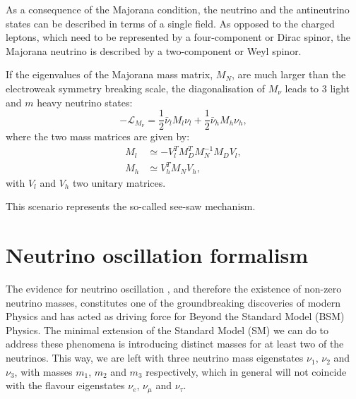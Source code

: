 As a consequence of the Majorana condition, the neutrino and the antineutrino states can be described in terms of a single field. As opposed to the charged leptons, which need to be represented by a four-component or Dirac spinor, the Majorana neutrino is described by a two-component or Weyl spinor.

If the eigenvalues of the Majorana mass matrix, $M_{N}$, are much larger than the electroweak symmetry breaking scale, the diagonalisation of $M_{\nu}$ leads to $3$ light and $m$ heavy neutrino states:
\begin{equation}
	-\mathcal{L}_{M_{\nu}} = \frac{1}{2} \bar{\nu}_{l} M_{l} \nu_{l} + \frac{1}{2} \bar{\nu}_{h} M_{h} \nu_{h},
\end{equation}
where the two mass matrices are given by:
\begin{equation}
	\begin{split}
		M_{l} &\simeq -V_{l}^{T} M_{D}^{T} M_{N}^{-1} M_{D} V_{l},\\
		M_{h} &\simeq V_{h}^{T} M_{N} V_{h},
	\end{split}
\end{equation}
with $V_{l}$ and $V_{h}$ two unitary matrices.

This scenario represents the so-called see-saw mechanism.

\section{Neutrino oscillation formalism}

The evidence for neutrino oscillation \cite{SuperKamiokande1998}, and therefore the existence of non-zero neutrino masses, constitutes one of the groundbreaking discoveries of modern Physics and has acted as driving force for Beyond the Standard Model (BSM) Physics. The minimal extension of the Standard Model (SM) we can do to address these phenomena is introducing distinct masses for at least two of the neutrinos. This way, we are left with three neutrino mass eigenstates $\nu_{1}$, $\nu_{2}$ and $\nu_{3}$, with masses $m_{1}$, $m_{2}$ and $m_{3}$ respectively, which in general will not coincide with the flavour eigenstates $\nu_{e}$, $\nu_{\mu}$ and $\nu_{\tau}$.

